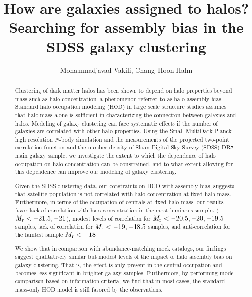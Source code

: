 \documentclass[12pt, preprint]{aastex}
\begin{document}
\title{How are galaxies assigned to halos? \\ Searching for assembly bias in the SDSS galaxy clustering}


\author{Mohammadjavad Vakili, Chang~Hoon Hahn}



\begin{abstract}

Clustering of dark matter halos has been shown to depend on halo properties beyond mass such as halo concentration, a phenomenon referred to as halo assembly bias. Standard halo occupation modeling (HOD) in large scale structure studies assumes that halo mass alone is sufficient in characterizing the connection between galaxies and halos. Modeling of galaxy clustering can face systematic effects if the number of galaxies are correlated with other halo properties. Using the Small MultiDark-Planck high resolution $N$-body simulation and the measurements of the projected two-point correlation function and the number density of Sloan Digital Sky Survey (SDSS) DR7 main galaxy sample, we investigate the extent to which the dependence of halo occupation on halo concentration can be constrained, and to what extent allowing for this dependence can improve our modeling of galaxy clustering.  

Given the SDSS clustering data, our constraints on HOD with assembly bias, suggests that satellite population is not correlated with halo concentration at fixed halo mass. Furthermore, in terms of the occupation of centrals at fixed halo mass, our results favor lack of correlation with halo concentration in the most luminous samples ($M_{\rm r}<-21.5,-21$), modest levels of correlation for $M_{\rm r}<-20.5,-20, -19.5$ samples, lack of correlation for $M_{\rm r}<-19,-18.5$ samples, and anti-correlation for the faintest sample $M_{\rm r}<-18$.

We show that in comparison with abundance-matching mock catalogs, our findings suggest qualitatively similar but modest levels of the impact of halo assembly bias on galaxy clustering. That is, the effect is only present in the central occupation and becomes less significant in brighter galaxy samples.
Furthermore, by performing model comparison based on information criteria, we find that in most cases, the standard mass-only HOD model is still favored by the observations.

\end{abstract}
\end{document}
